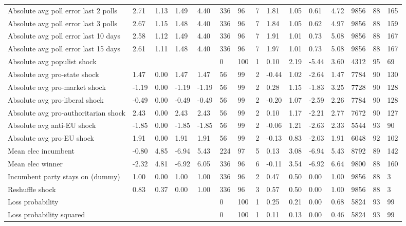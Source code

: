 \begin{longtable}{lllllllllllllll}
Absolute avg poll error last 2 polls & 2.71 & 1.13 & 1.49 & 4.40 & 336 & 96 & 7 & 1.81 & 1.05 & 0.61 & 4.72 & 9856 & 88 & 165\\
\addlinespace
Absolute avg poll error last 3 polls & 2.67 & 1.15 & 1.48 & 4.40 & 336 & 96 & 7 & 1.84 & 1.05 & 0.62 & 4.97 & 9856 & 88 & 159\\
Absolute avg poll error last 10 days & 2.58 & 1.12 & 1.49 & 4.40 & 336 & 96 & 7 & 1.91 & 1.01 & 0.73 & 5.08 & 9856 & 88 & 167\\
Absolute avg poll error last 15 days & 2.61 & 1.11 & 1.48 & 4.40 & 336 & 96 & 7 & 1.97 & 1.01 & 0.73 & 5.08 & 9856 & 88 & 167\\
Absolute avg populist shock &  &  &  &  & 0 & 100 & 1 & 0.10 & 2.19 & -5.44 & 3.60 & 4312 & 95 & 69\\
Absolute avg pro-state shock & 1.47 & 0.00 & 1.47 & 1.47 & 56 & 99 & 2 & -0.44 & 1.02 & -2.64 & 1.47 & 7784 & 90 & 130\\
\addlinespace
Absolute avg pro-market shock & -1.19 & 0.00 & -1.19 & -1.19 & 56 & 99 & 2 & 0.28 & 1.15 & -1.83 & 3.25 & 7728 & 90 & 128\\
Absolute avg pro-liberal shock & -0.49 & 0.00 & -0.49 & -0.49 & 56 & 99 & 2 & -0.20 & 1.07 & -2.59 & 2.26 & 7784 & 90 & 128\\
Absolute avg pro-authoritarian shock & 2.43 & 0.00 & 2.43 & 2.43 & 56 & 99 & 2 & 0.10 & 1.17 & -2.21 & 2.77 & 7672 & 90 & 127\\
Absolute avg anti-EU shock & -1.85 & 0.00 & -1.85 & -1.85 & 56 & 99 & 2 & -0.06 & 1.21 & -2.63 & 2.33 & 5544 & 93 & 90\\
Absolute avg pro-EU shock & 1.91 & 0.00 & 1.91 & 1.91 & 56 & 99 & 2 & -0.13 & 0.83 & -2.03 & 1.91 & 6048 & 92 & 102\\
\addlinespace
Mean elec incumbent & -0.80 & 4.85 & -6.94 & 5.43 & 224 & 97 & 5 & 0.13 & 3.08 & -6.94 & 5.43 & 8792 & 89 & 142\\
Mean elec winner & -2.32 & 4.81 & -6.92 & 6.05 & 336 & 96 & 6 & -0.11 & 3.54 & -6.92 & 6.64 & 9800 & 88 & 160\\
Incumbent party stays on (dummy) & 1.00 & 0.00 & 1.00 & 1.00 & 336 & 96 & 2 & 0.47 & 0.50 & 0.00 & 1.00 & 9856 & 88 & 3\\
Reshuffle shock & 0.83 & 0.37 & 0.00 & 1.00 & 336 & 96 & 3 & 0.57 & 0.50 & 0.00 & 1.00 & 9856 & 88 & 3\\
Loss probability &  &  &  &  & 0 & 100 & 1 & 0.25 & 0.21 & 0.00 & 0.68 & 5824 & 93 & 99\\
\addlinespace
Loss probability squared &  &  &  &  & 0 & 100 & 1 & 0.11 & 0.13 & 0.00 & 0.46 & 5824 & 93 & 99\\

\end{longtable}
